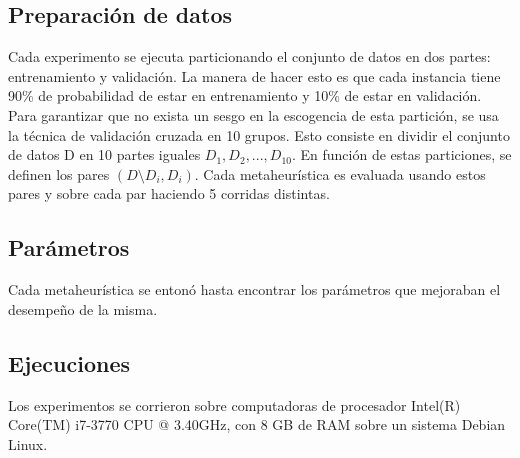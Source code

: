 \documentclass[11pt]{article}
\begin{document}
\subsection{Preparación de datos}

Cada experimento se ejecuta particionando el conjunto de datos en dos partes: entrenamiento y validación. La manera de hacer esto es que cada instancia tiene 90\% de probabilidad de estar en entrenamiento y 10\% de estar en validación. Para garantizar que no exista un sesgo en la escogencia de esta partición, se usa la técnica de validación cruzada en 10 grupos. Esto consiste en dividir el conjunto de datos D en 10 partes iguales $D_1, D_2, ..., D_{10}$. En función de estas particiones, se definen los pares $(D \setminus D_i, D_i)$. Cada metaheurística es evaluada usando estos pares y sobre cada par haciendo 5 corridas distintas.


\subsection{Parámetros}

Cada metaheurística se entonó hasta encontrar los parámetros que mejoraban el desempeño de la misma.

\begin{table}[h]
\caption{Parámetros usados en metaheurísticas}
\label{tabla:2}
\end{table}

\subsection{Ejecuciones}
Los experimentos se corrieron sobre computadoras de procesador Intel(R) Core(TM) i7-3770 CPU @ 3.40GHz, con 8 GB de RAM sobre un sistema Debian Linux.
\end{document}

